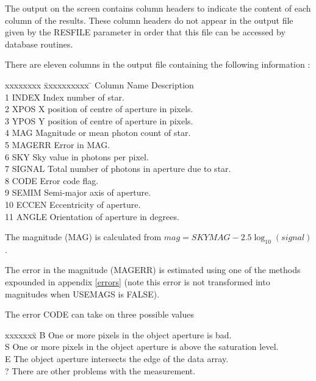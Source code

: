 \documentclass[twoside,11pt]{article}
\renewcommand{\_}{\texttt{\symbol{95}}}
\begin{document}
{{   The output on the screen contains column headers to indicate the content of
   each column of the results. These column headers do not appear in the
   output file given by the RESFILE parameter in order that this file can be
   accessed by database routines.

   There are eleven columns in the output file containing the following
   information :

   \begin{tabbing}
   xxxxxxxx \= xxxxxxxxxx \= \kill
   Column \> Name  \> Description \\
    1 \> INDEX \> Index number of star.\\
    2 \> XPOS \> X position of centre of aperture in pixels.\\
    3 \> YPOS \> Y position of centre of aperture in pixels.\\
    4 \> MAG \> Magnitude or mean photon count of star.\\
    5 \> MAGERR \> Error in MAG.\\
    6 \> SKY \> Sky value in photons per pixel.\\
    7 \> SIGNAL \> Total number of photons in aperture due to star.\\
    8 \> CODE \> Error code flag.\\
    9 \> SEMIM \> Semi-major axis of aperture.\\
    10 \> ECCEN \> Eccentricity of aperture.\\
    11 \> ANGLE \> Orientation of aperture in degrees.\\
   \end{tabbing}

   The magnitude (MAG) is calculated from
      $mag = SKYMAG - 2.5 \log_{10} ( signal )$.

   The error in the magnitude (MAGERR) is estimated using one of the
   methods expounded in appendix \ref{errors} (note this error is not
   transformed into magnitudes when USEMAGS is FALSE).

   The error CODE can take on three possible values
   \begin{tabbing}
   xxxxxxx\=\kill
   B \> One or more pixels in the object aperture is bad.\\
   S \> One or more pixels in the object aperture is above the saturation level.\\
   E \> The object aperture intersects the edge of the data array.\\
   ? \> There are other problems with the measurement.
   \end{tabbing}

}}
\end{document}
